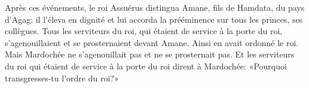 Après ces événements, le roi Assuérus distingua Amane, fils de Hamdata, du pays d’Agag;
	il l’éleva en dignité
	et lui accorda la prééminence sur tous les princes, ses collègues.
Tous les serviteurs du roi, qui étaient de service à la porte du roi,
	s’agenouillaient et se prosternaient devant Amane.
	Ainsi en avait ordonné le roi.
Mais Mardochée ne s’agenouillait pas et ne se prosternait pas.
Et les serviteurs du roi qui étaient de service à la porte du roi dirent à Mardochée:
	«Pourquoi transgresses-tu l’ordre du roi?»

